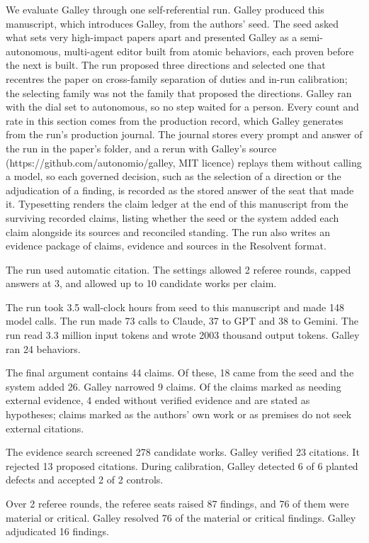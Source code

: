 \documentclass[
]{article}
\begin{document}
We evaluate Galley through one self-referential run. Galley produced
this manuscript, which introduces Galley, from the authors' seed. The
seed asked what sets very high-impact papers apart and presented Galley
as a semi-autonomous, multi-agent editor built from atomic behaviors,
each proven before the next is built. The run proposed three directions
and selected one that recentres the paper on cross-family separation of
duties and in-run calibration; the selecting family was not the family
that proposed the directions. Galley ran with the dial set to
autonomous, so no step waited for a person. Every count and rate in this
section comes from the production record, which Galley generates from
the run's production journal. The journal stores every prompt and answer
of the run in the paper's folder, and a rerun with Galley's source
(https://github.com/autonomio/galley, MIT licence) replays them without
calling a model, so each governed decision, such as the selection of a
direction or the adjudication of a finding, is recorded as the stored
answer of the seat that made it. Typesetting renders the claim ledger at
the end of this manuscript from the surviving recorded claims, listing
whether the seed or the system added each claim alongside its sources
and reconciled standing. The run also writes an evidence package of
claims, evidence and sources in the Resolvent format.

The run used automatic citation. The settings allowed 2 referee rounds,
capped answers at 3, and allowed up to 10 candidate works per claim.

The run took 3.5 wall-clock hours from seed to this manuscript and made
148 model calls. The run made 73 calls to Claude, 37 to GPT and 38 to
Gemini. The run read 3.3 million input tokens and wrote 2003 thousand
output tokens. Galley ran 24 behaviors.

The final argument contains 44 claims. Of these, 18 came from the seed
and the system added 26. Galley narrowed 9 claims. Of the claims marked
as needing external evidence, 4 ended without verified evidence and are
stated as hypotheses; claims marked as the authors' own work or as
premises do not seek external citations.

The evidence search screened 278 candidate works. Galley verified 23
citations. It rejected 13 proposed citations. During calibration, Galley
detected 6 of 6 planted defects and accepted 2 of 2 controls.

Over 2 referee rounds, the referee seats raised 87 findings, and 76 of
them were material or critical. Galley resolved 76 of the material or
critical findings. Galley adjudicated 16 findings.
\end{document}
